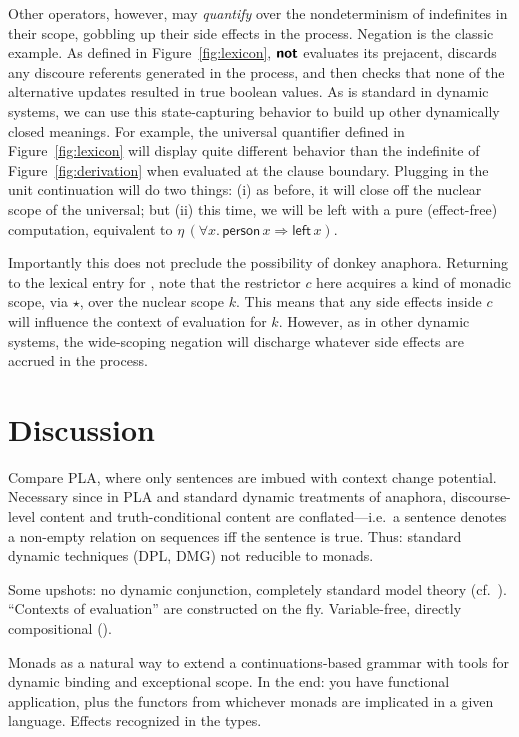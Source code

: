   Other operators, however, may \emph{quantify} over the nondeterminism of indefinites in their scope, gobbling up their side effects in the process. Negation is the classic example. As defined in Figure~\ref{fig:lexicon}, $\textbf{\textsf{not}}$ evaluates its prejacent, discards any discoure referents generated in the process, and then checks that none of the alternative updates resulted in true boolean values. As is standard in dynamic systems, we can use this state-capturing behavior to build up other dynamically closed meanings. For example, the universal quantifier defined in Figure~\ref{fig:lexicon} will display quite different behavior than the indefinite of Figure~\ref{fig:derivation} when evaluated at the clause boundary. Plugging in the unit continuation will do two things: (i) as before, it will close off the nuclear scope of the universal; but (ii) this time, we will be left with a pure (effect-free) computation, equivalent to $\eta\,(\forall x.\,\textsf{person}\,x \Rightarrow \textsf{left}\,x)$.

  Importantly this does not preclude the possibility of donkey anaphora. Returning to the lexical entry for , note that the restrictor $c$ here acquires a kind of monadic scope, via $\star$, over the nuclear scope $k$. This means that any side effects inside $c$ will influence the context of evaluation for $k$. However, as in other dynamic systems, the wide-scoping negation will discharge whatever side effects are accrued in the process. %

\section{Discussion}
	Compare PLA, where only sentences are imbued with context change potential. Necessary since in PLA and standard dynamic treatments of anaphora, discourse-level content and truth-conditional content are conflated---i.e.~a sentence denotes a non-empty relation on sequences iff the sentence is true. Thus: standard dynamic techniques (DPL, DMG) not reducible to monads. %
	
	Some upshots: no dynamic conjunction, completely standard model theory (cf.~\citealt{Groote:2006}). ``Contexts of evaluation'' are constructed on the fly. Variable-free, directly compositional (\citealt{Jacobson:1999}). %

	Monads as a natural way to extend a continuations-based grammar with tools for dynamic binding and exceptional scope. In the end: you have functional application, plus the functors from whichever monads are implicated in a given language. Effects recognized in the types. %

